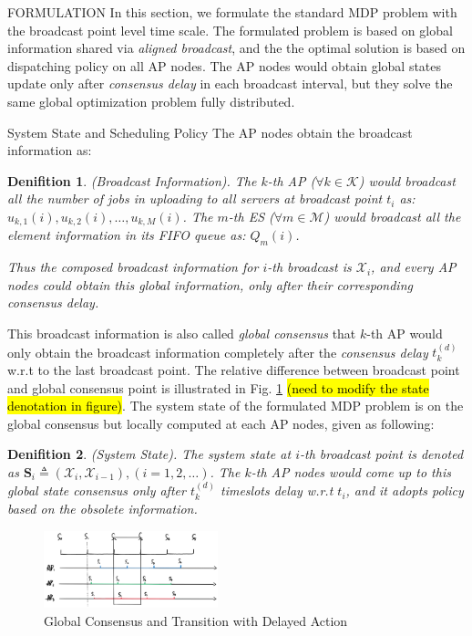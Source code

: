 \documentclass[10pt, conference, letterpaper]{IEEEtran}
\newtheorem{definition}{Denifition}
\newcommand{\define}{\triangleq}
\newcommand{\apSet}{\mathcal{K}}
\newcommand{\esSet}{\mathcal{M}}
\newcommand{\Stat}{\mathbf{S}}
\newcommand{\Obsv}{\mathcal{X}}
\begin{document}
    \begin{section}{FORMULATION}
        \label{sec:formulation}
        In this section, we formulate the standard MDP problem with the broadcast point level time scale. The formulated problem is based on global information shared via \emph{aligned broadcast}, and the the optimal solution is based on dispatching policy on all AP nodes. The AP nodes would obtain global states update only after \emph{consensus delay} in each broadcast interval, but they solve the same global optimization problem fully distributed.

        \begin{subsection}{System State and Scheduling Policy}
            The AP nodes obtain the broadcast information as:
            \begin{definition}(Broadcast Information).
                The $k$-th AP ($\forall k\in\apSet$) would broadcast all the number of jobs in uploading to all servers at broadcast point $t_i$ as: $u_{k,1}(i), u_{k,2}(i), \dots, u_{k,M}(i)$.
                The $m$-th ES ($\forall m\in\esSet$) would broadcast all the element information in its FIFO queue as: $Q_m(i)$.

                Thus the composed broadcast information for $i$-th broadcast is $\Obsv_i$, and every AP nodes could obtain this global information, only after their corresponding consensus delay.
            \end{definition}

            This broadcast information is also called \emph{global consensus} that $k$-th AP would only obtain the broadcast information completely after the \emph{consensus delay} $t^{(d)}_k$ w.r.t to the last broadcast point. The relative difference between broadcast point and global consensus point is illustrated in Fig. \ref{fig:br-trans} \hl{(need to modify the state denotation in figure)}.
            The system state of the formulated MDP problem is on the global consensus but locally computed at each AP nodes, given as following:
            \begin{definition}(System State).
                The system state at $i$-th broadcast point is denoted as $\Stat_i \define (\Obsv_{i}, \Obsv_{i-1}), (i=1,2,\dots)$.
                The $k$-th AP nodes would come up to this global state consensus only after $t^{(d)}_k$ timeslots delay w.r.t $t_i$, and it adopts policy based on the obsolete information.
            \end{definition}
            \begin{figure}[ht]
                \centering
                \includegraphics[width=0.45\textwidth]{broadcast-trans.png}
                \caption{Global Consensus and Transition with Delayed Action}
                \label{fig:br-trans}
            \end{figure}


\end{subsection}
\end{section}
\end{document}
